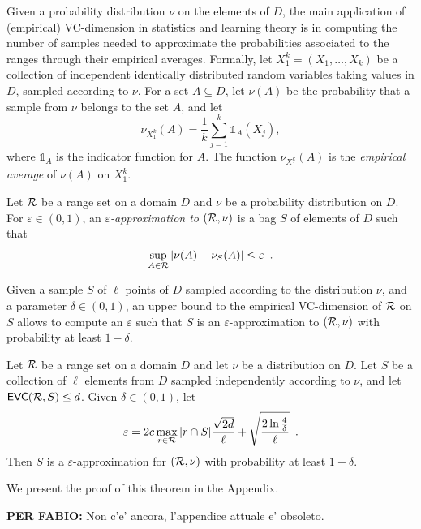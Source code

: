 Given a probability distribution $\nu$ on the elements of $D$, the main
application of (empirical) VC-dimension in statistics and learning theory is in
computing the number of samples needed to approximate the probabilities
associated to the ranges through their empirical averages.  Formally, let
$X_1^k=(X_1,\dotsc,X_k)$ be a collection of independent identically distributed
random variables taking values in $D$, sampled according to $\nu$.
For a set $A\subseteq D$, let $\nu(A)$ be the probability that a sample from
$\nu$ belongs to the set $A$, and let
\[
\nu_{X_1^k}(A)=\frac{1}{k}\sum_{j=1}^k\mathds{1}_A(X_j),\]
where $\mathds{1}_A$ is the indicator function for $A$. The function
$\nu_{X_1^k}(A)$ is the \emph{empirical average} of $\nu(A)$ on $X_1^k$.

\begin{definition}\label{def:eapprox}
  Let $\mathcal{R}$ be a range set on a domain
  $D$ and $\nu$ be a probability distribution on $D$. For $\varepsilon\in(0,1)$,
  an \emph{$\varepsilon$-approximation to $(\mathcal{R},\nu)$} is a bag $S$ of
  elements of $D$ such that
  \[
  \sup_{A\in\mathcal{R}}|\nu(A)-\nu_S(A)|\le\varepsilon\enspace.\]
\end{definition}

Given a sample $S$ of $\ell$ points of $D$ sampled according to the distribution
$\nu$, and a parameter $\delta\in(0,1)$, an upper bound to the empirical
VC-dimension of $\mathcal{R}$ on $S$ allows to compute an $\varepsilon$ such that $S$
is an $\varepsilon$-approximation to $(\mathcal{R},\nu)$ with probability at least
$1-\delta$.

\begin{theorem}\label{thm:eapproxempir}
	Let $\mathcal{R}$ be a range set on a domain $D$ and let $\nu$ be a distribution
	on $D$. Let $S$ be a collection of $\ell$ elements from $D$ sampled
	independently according to $\nu$, and let $\mathsf{EVC}(\mathcal{R},S)\le d$. Given
	$\delta\in(0,1)$, let
	\begin{equation}\label{eq:evceapprox}
		\varepsilon = 2c\max_{r\in\mathcal{R}}|r\cap S|\frac{\sqrt{2d}}{\ell} +
		\sqrt{\frac{2\ln\frac{4}{\delta}}{\ell}}\enspace.
	\end{equation}
	Then $S$ is a $\varepsilon$-approximation for $(\mathcal{R},\nu)$ with
	probability at least $1-\delta$.
\end{theorem}
We present the proof of this theorem in the Appendix.

{\bf PER FABIO:} Non c'e' ancora, l'appendice attuale e' obsoleto.

